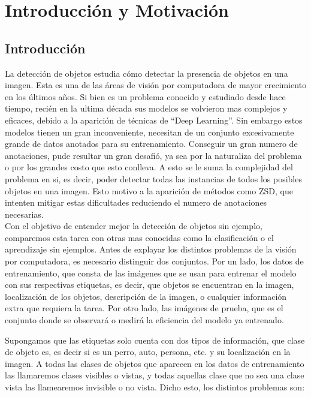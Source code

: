 \chapter{Introducción y Motivación} \label{cap:intro}

\section{Introducción} \label{sec:introduccion}
La detección de objetos estudia cómo detectar la presencia de objetos en una imagen. Esta es una de las áreas de visión por computadora de mayor crecimiento en los últimos años. Si bien es un problema conocido y estudiado desde hace tiempo, recién en la ultima década sus modelos se volvieron mas complejos y eficaces, debido a la aparición de técnicas  de ``Deep Learning''. Sin embargo estos modelos tienen un gran inconveniente, necesitan de un conjunto excesivamente grande de datos anotados para su entrenamiento. Conseguir un gran numero de anotaciones, pude resultar un gran desafió, ya sea por la naturaliza del problema o por los grandes costo que esto conlleva. A esto se le suma la complejidad del problema en si, es decir, poder detectar todas las instancias de todos los posibles objetos en una imagen. Esto motivo a la aparición de métodos como ZSD, que intenten mitigar estas dificultades reduciendo el numero de anotaciones necesarias.\\

Con el objetivo de entender mejor la detección de objetos sin ejemplo, comparemos esta tarea con otras mas conocidas como la clasificación o el aprendizaje sin ejemplos. Antes de explayar los distintos problemas de la visión por computadora, es necesario distinguir dos conjuntos. Por un lado, los datos de entrenamiento, que consta de las imágenes que se usan para entrenar el modelo con sus respectivas etiquetas, es decir, que objetos se encuentran en la imagen, localización de los objetos, descripción de la imagen, o cualquier información extra que requiera la tarea. Por otro lado, las imágenes de prueba, que es el conjunto donde se observará o medirá la eficiencia del modelo ya entrenado. 

Supongamos que las etiquetas solo cuenta con dos tipos de información, que clase de objeto es, es decir si es un perro, auto, persona, etc. y su localización en la imagen. A todas las clases de objetos que aparecen en los datos de entrenamiento las llamaremos clases visibles o vistas, y todas aquellas clase que no sea una clase vista las llamearemos invisible o no vista. Dicho esto, los distintos problemas son:


